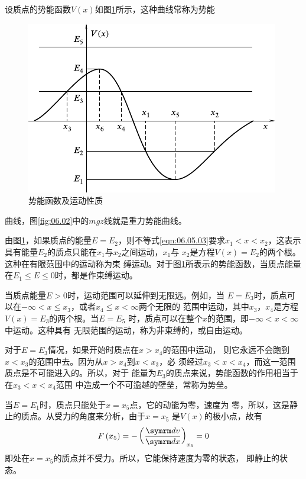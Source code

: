 设质点的势能函数$ V \left( x \right) $如图\ref{fig:06.12}所示，这种曲线常称为势能
\begin{figure}[h]
  \centering
  \includegraphics{figure/fig06.12}
  \caption{势能函数及运动性质}
  \label{fig:06.12}
  \vspace{-0.8em}
\end{figure}
\clearpage\noindent
曲线，图\ref{fig:06.02}中的$ mgz $线就是重力势能曲线。


由图\ref{fig:06.12}，如果质点的能量$ E=E_2 $，则不等式\eqref{eqn:06.05.03}要求$x _ 1
  < x < x _ 2$，这表示具有能量$ E_2 $的质点只能在$ x_1 $与$ x_2 $之间运动，$ x_1 $与
$ x_2 $是方程$ V \left(x\right) = E_2 $的两个根。这种在有限范围中的运动称为束
缚运动。对于图\ref{fig:06.12}所表示的势能函数，当质点能量在$ E_1 \leqslant E \leqslant 0 $时，都是作束缚运动。

当质点能量$ E > 0 $时，运动范围可以延伸到无限远。例如，当
$ E = E _ 3 $时，质点可以在$ -\infty < x \leqslant x_3 $，或者$ x_4 \leqslant x < \infty $两个无限的
范围中运动，其中$ x_3 $，$ x_4 $是方程$ V \left( x \right) = E _ { 3 } $的两个根。当$ E = E _ 5 $
时，质点可以在整个$ x $的范围，即$ - \infty < x < \infty $中运动。这种具有
无限范围的运动，称为非束缚的，或自由运动。

对于$ E = E _ 3 $情况，如果开始时质点在$ x > x _ { 4 } $的范围中运动，
则它永远不会跑到$ x < x_3 $的范围中去。因为从$ x > x _ { 4 } $到$ x < x _ 3 $，必
须经过$ x_3 < x < x_4 $，而这一范围质点是不可能进入的。所以，对于
能量为$ E_3 $的质点来说，势能函数的作用相当于在$ x _ { 3 } < x < x _ { 4 } $范围
中造成一个不可逾越的壁垒，常称为势垒。

当$ E = E _ 1 $时，质点只能处于$ x = x_5 $点，它的动能为零，速度为
零，所以，这是静止的质点。从受力的角度来分析，由于$ x = x_5 $
是$ V\left(x\right) $的极小点，故有
\begin{equation*}
  F \left( x _ { 5 } \right) = - \left( \frac { \dif v } { \dif x } \right) _ { x _ 5 } = 0
\end{equation*}
即处在$ x = x_5 $的质点并不受力。所以，它能保持速度为零的状态，
即静止的状态。

